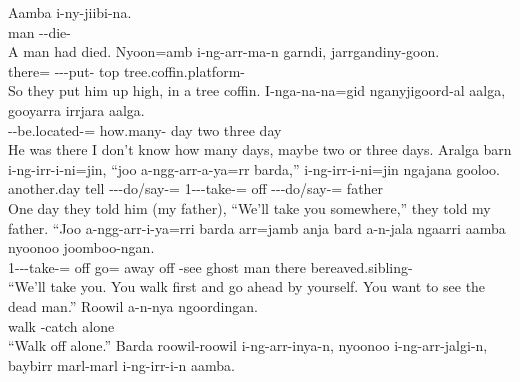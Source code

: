 \setcounter{exxy}{0}\begin{exye}
\exy {}
\gll Aamba i-ny-jiibi-na.\\
man --die-\\
\ft A man had died.
\exy {}
\gll Nyoon=amb i-ng-arr-ma-n garndi, jarrgandiny-goon.\\
there= ---put- top tree.coffin.platform-\\
\ft So they put him up high, in a tree coffin.
\exy {}
\gll I-nga-na-na=gid nganyjigoord-al aalga, gooyarra irrjara aalga.\\
--be.located-= how.many- day two three day\\
\ft He was there I don't know how many days, maybe two or three days.
\exy {}
\gll Aralga barn i-ng-irr-i-ni=jin, ``joo a-ngg-arr-a-ya=rr barda,'' i-ng-irr-i-ni=jin ngajana gooloo.\\
another.day tell ---do/say-=  1---take-= off ---do/say-=  father\\
\ft One day they told him (my father), ``We'll take you somewhere,'' they told my father.
\exy {}
\gll ``Joo a-ngg-arr-i-ya=rri barda arr=jamb anja bard a-n-jala ngaarri aamba nyoonoo j{oo}mboo-ngan.\\
 1---take-= off go= away off -see ghost man there bereaved.sibling-\\
\ft ``We'll take you. You walk first and go ahead by yourself. You want to see the dead man.''
\exy {}
\gll Roowil a-n-nya ngoordingan.\\
walk -catch alone\\
\ft ``Walk off alone.''
\exy {}
\gll Barda roowil-roowil i-ng-arr-inya-n, nyoonoo i-ng-arr-jalgi-n, baybirr marl-marl i-ng-irr-i-n aamba.\\

\end{exye}

